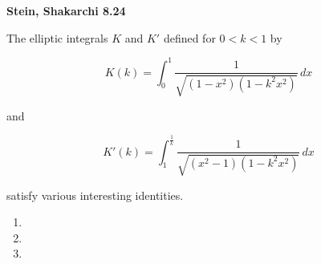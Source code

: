\textbf{Stein, Shakarchi 8.24}

The elliptic integrals $K$ and $K'$ defined for $0 < k < 1$ by

$$
K(k) = \int_0^1 \frac{1}{\sqrt{\left(1 - x^2\right)\left(1 - k^2 x^2\right)}} \, dx
$$

and

$$
K'(k) = \int_1^{\frac{1}{k}} \frac{1}{\sqrt{\left(x^2 - 1\right)\left(1 - k^2 x^2\right)}} \, dx
$$

satisfy various interesting identities.

\begin{enumerate}
  \item 
  \pagebreak
  \item  
  \pagebreak
  \item 
\end{enumerate}
